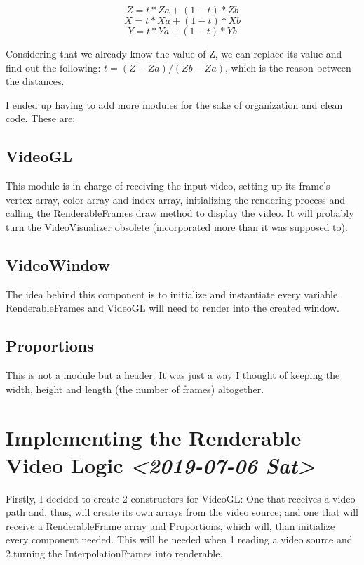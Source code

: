 \documentclass[11pt]{article}
\begin{document}
$$Z = t * Za + (1 - t) * Zb$$
$$X = t * Xa + (1 - t) * Xb$$
$$Y = t * Ya + (1 - t) * Yb$$

Considering that we already know the value of Z, we can replace its value and find out the following: \(t = (Z − Za)/(Zb − Za)\), which is the reason between the distances.

I ended up having to add more modules for the sake of organization and
clean code. These are:

\subsection*{VideoGL}
\label{sec:org2bbccc9}

This module is in charge of receiving the input video, setting up its frame’s vertex array, color array and index array, initializing the rendering process and calling the RenderableFrames draw method to display the video. It will probably turn the VideoVisualizer obsolete (incorporated more than it was supposed to).

\subsection*{VideoWindow}
\label{sec:org1594f9e}

The idea behind this component is to initialize and instantiate every variable RenderableFrames and VideoGL will need to render into the created window.

\subsection*{Proportions}
\label{sec:org70b39da}

This is not a module but a header. It was just a way I thought of keeping the width, height and length (the number of frames) altogether.

\section*{Implementing the Renderable Video Logic \textit{<2019-07-06 Sat>}}
\label{sec:orgaa7b874}

Firstly, I decided to create 2 constructors for VideoGL: One that receives a video path and, thus, will create its own arrays from the video source; and one that will receive a RenderableFrame array and Proportions, which will, than initialize every component needed. This will be needed when 1.reading a video source and 2.turning the InterpolationFrames into renderable.
\end{document}
